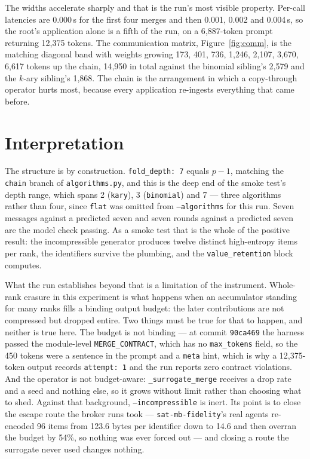 \documentclass[11pt]{article}
\begin{document}
The widths accelerate sharply and that is the run's most visible property. Per-call
latencies are 0.000\,s for the first four merges and then 0.001, 0.002 and 0.004\,s, so the
root's application alone is a fifth of the run, on a 6{,}887-token prompt returning 12{,}375
tokens. The communication matrix, Figure~\ref{fig:comm}, is the matching diagonal band with
weights growing 173, 401, 736, 1{,}246, 2{,}107, 3{,}670, 6{,}617 tokens up the chain,
14{,}950 in total against the binomial sibling's 2{,}579 and the $k$-ary sibling's 1{,}868.
The chain is the arrangement in which a copy-through operator hurts most, because every
application re-ingests everything that came before.

\section{Interpretation}

The structure is by construction. \texttt{fold\_depth: 7} equals $p-1$, matching the
\texttt{chain} branch of \texttt{algorithms.py}, and this is the deep end of the smoke test's
depth range, which spans 2 (\texttt{kary}), 3 (\texttt{binomial}) and 7 --- three algorithms
rather than four, since \texttt{flat} was omitted from \texttt{--algorithms} for this run.
Seven messages against a predicted seven and seven rounds against a predicted seven are the
model check passing. As a smoke test that is the whole of the positive result: the
incompressible generator produces twelve distinct high-entropy items per rank, the
identifiers survive the plumbing, and the \texttt{value\_retention} block computes.

What the run establishes beyond that is a limitation of the instrument. Whole-rank erasure in
this experiment is what happens when an accumulator standing for many ranks fills a binding
output budget: the later contributions are not compressed but dropped entire. Two things must
be true for that to happen, and neither is true here. The budget is not binding --- at commit
\texttt{90ca469} the harness passed the module-level \texttt{MERGE\_CONTRACT}, which has no
\texttt{max\_tokens} field, so the 450 tokens were a sentence in the prompt and a
\texttt{meta} hint, which is why a 12{,}375-token output records \texttt{attempt: 1} and the
run reports zero contract violations. And the operator is not budget-aware:
\texttt{\_surrogate\_merge} receives a drop rate and a seed and nothing else, so it grows
without limit rather than choosing what to shed. Against that background,
\texttt{--incompressible} is inert. Its point is to close the escape route the broker runs
took --- \texttt{sat-mb-fidelity}'s real agents re-encoded 96 items from 123.6 bytes per
identifier down to 14.6 and then overran the budget by 54\%, so nothing was ever forced out
--- and closing a route the surrogate never used changes nothing.
\end{document}
